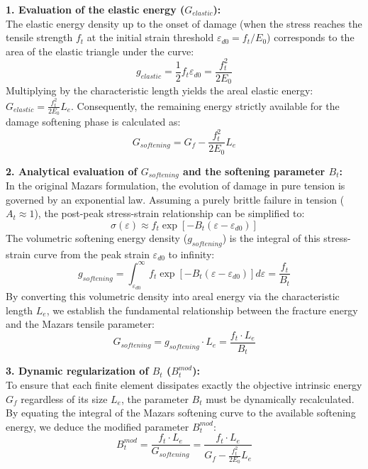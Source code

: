 \documentclass[a4paper,12pt,twoside]{report}     %
\begin{document}
\textbf{1. Evaluation of the elastic energy ($G_{elastic}$):} \\
The elastic energy density up to the onset of damage (when the stress reaches the tensile strength $f_t$ at the initial strain threshold $\varepsilon_{d0} = f_t/E_0$) corresponds to the area of the elastic triangle under the curve:
\begin{equation}
    g_{elastic} = \frac{1}{2} f_t \varepsilon_{d0} = \frac{f_t^2}{2E_0}
\end{equation}
Multiplying by the characteristic length yields the areal elastic energy: $G_{elastic} = \frac{f_t^2}{2E_0} L_e$. Consequently, the remaining energy strictly available for the damage softening phase is calculated as:
\begin{equation}
    G_{softening} = G_f - \frac{f_t^2}{2E_0} L_e
\end{equation}

\textbf{2. Analytical evaluation of $G_{softening}$ and the softening parameter $B_t$:} \\
In the original Mazars formulation, the evolution of damage in pure tension is governed by an exponential law. Assuming a purely brittle failure in tension ($A_t \approx 1$), the post-peak stress-strain relationship can be simplified to:
\begin{equation}
    \sigma(\varepsilon) \approx f_t \exp\left[ -B_t (\varepsilon - \varepsilon_{d0}) \right]
\end{equation}
The volumetric softening energy density ($g_{softening}$) is the integral of this stress-strain curve from the peak strain $\varepsilon_{d0}$ to infinity:
\begin{equation}
    g_{softening} = \int_{\varepsilon_{d0}}^{\infty} f_t \exp\left[ -B_t (\varepsilon - \varepsilon_{d0}) \right] d\varepsilon = \frac{f_t}{B_t}
\end{equation}
By converting this volumetric density into areal energy via the characteristic length $L_e$, we establish the fundamental relationship between the fracture energy and the Mazars tensile parameter:
\begin{equation}
    G_{softening} = g_{softening} \cdot L_e = \frac{f_t \cdot L_e}{B_t}
\end{equation}

\textbf{3. Dynamic regularization of $B_t$ ($B_t^{mod}$):} \\
To ensure that each finite element dissipates exactly the objective intrinsic energy $G_f$ regardless of its size $L_e$, the parameter $B_t$ must be dynamically recalculated. By equating the integral of the Mazars softening curve to the available softening energy, we deduce the modified parameter $B_t^{mod}$:
\begin{equation}
    B_t^{mod} = \frac{f_t \cdot L_e}{G_{softening}} = \frac{f_t \cdot L_e}{G_f - \frac{f_t^2}{2E_0} L_e}
\end{equation}
\end{document}
